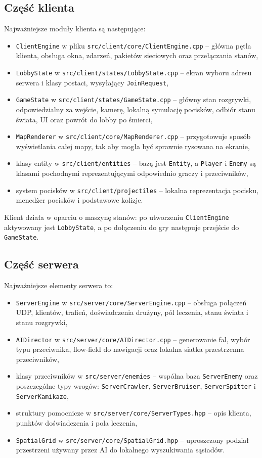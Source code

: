 \documentclass[a4paper,12pt]{article}
\begin{document}
\subsection{Część klienta}
Najważniejsze moduły klienta są następujące:
\begin{itemize}[leftmargin=1.5cm]
    \item \texttt{ClientEngine} w pliku \texttt{src/client/core/ClientEngine.cpp} -- główna pętla klienta, obsługa okna, zdarzeń, pakietów sieciowych oraz przełączania stanów,
    \item \texttt{LobbyState} w \texttt{src/client/states/LobbyState.cpp} -- ekran wyboru adresu serwera i klasy postaci, wysyłający \texttt{JoinRequest},
    \item \texttt{GameState} w \texttt{src/client/states/GameState.cpp} -- główny stan rozgrywki, odpowiedzialny za wejście, kamerę, lokalną symulację pocisków, odbiór stanu świata, UI oraz powrót do lobby po śmierci,
    \item \texttt{MapRenderer} w \texttt{src/client/core/MapRenderer.cpp} -- przygotowuje sposób wyświetlania całej mapy, tak aby mogła być sprawnie rysowana na ekranie,
    \item klasy entity w \texttt{src/client/entities} -- bazą jest \texttt{Entity}, a \texttt{Player} i \texttt{Enemy} są klasami pochodnymi reprezentującymi odpowiednio graczy i przeciwników,
    \item system pocisków w \texttt{src/client/projectiles} -- lokalna reprezentacja pocisku, menedżer pocisków i podstawowe kolizje.
\end{itemize}

Klient działa w oparciu o maszynę stanów: po utworzeniu \texttt{ClientEngine} aktywowany jest \texttt{LobbyState}, a po dołączeniu do gry następuje przejście do \texttt{GameState}.

\subsection{Część serwera}
Najważniejsze elementy serwera to:
\begin{itemize}[leftmargin=1.5cm]
    \item \texttt{ServerEngine} w \texttt{src/server/core/ServerEngine.cpp} -- obsługa połączeń UDP, klientów, trafień, doświadczenia drużyny, pól leczenia, stanu świata i stanu rozgrywki,
    \item \texttt{AIDirector} w \texttt{src/server/core/AIDirector.cpp} -- generowanie fal, wybór typu przeciwnika, flow-field do nawigacji oraz lokalna siatka przestrzenna przeciwników,
    \item klasy przeciwników w \texttt{src/server/enemies} -- wspólna baza \texttt{ServerEnemy} oraz poszczególne typy wrogów: \texttt{ServerCrawler}, \texttt{ServerBruiser}, \texttt{ServerSpitter} i \texttt{ServerKamikaze},
    \item struktury pomocnicze w \texttt{src/server/core/ServerTypes.hpp} -- opis klienta, punktów doświadczenia i pola leczenia,
    \item \texttt{SpatialGrid} w \texttt{src/server/core/SpatialGrid.hpp} -- uproszczony podział przestrzeni używany przez AI do lokalnego wyszukiwania sąsiadów.
\end{itemize}
\end{document}
